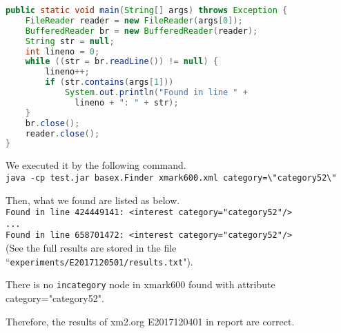 \begin{lstlisting}[language=java,frame=single]
public static void main(String[] args) throws Exception {
    FileReader reader = new FileReader(args[0]);
    BufferedReader br = new BufferedReader(reader);
    String str = null;
    int lineno = 0;
    while ((str = br.readLine()) != null) {
        lineno++;
        if (str.contains(args[1]))
            System.out.println("Found in line " +
              lineno + ": " + str);
    }
    br.close();
    reader.close();
}
\end{lstlisting}

We executed it by the following command.\\
\verb|java -cp test.jar basex.Finder xmark600.xml category=\"category52\"|

Then, what we found are listed as below.\\
\verb|Found in line 424449141: <interest category="category52"/>|\\
\verb|...|\\
\verb|Found in line 658701472: <interest category="category52"/>|\\
(See the full results are stored in the file ``\texttt{experiments/E2017120501/results.txt}"). 

There is no \texttt{incategory} node in xmark600 found with attribute category="category52". 

Therefore, the results of xm2.org E2017120401 in report are correct.


